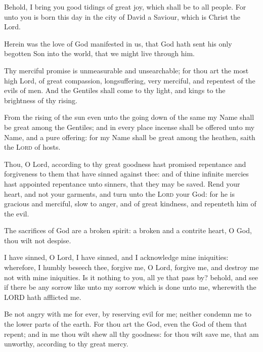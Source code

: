 \begin{multicols}{2}
	Behold, I bring you good tidings of great joy, which shall be to all people. For unto you is born this day in the city of David a Saviour, which is Christ the Lord.
	\par
	Herein was the love of God manifested in us, that God hath sent his only begotten Son into the world, that we might live through him. 
	\par
	Thy merciful promise is unmeasurable and unsearchable; for thou art the most high Lord, of great compassion, longsuffering, very merciful, and repentest of the evils of men. 
	And the Gentiles shall come to thy light, and kings to the brightness of thy rising.\par
	From the rising of the sun even unto the going down of the same my Name shall be great among the Gentiles; and in every place incense shall be offered unto my Name, and a pure offering: for my Name shall be great among the heathen, saith the \textsc{Lord} of hosts.
	\par
    Thou, O Lord, according to thy great goodness hast promised repentance and forgiveness to them that have sinned against thee: and of thine infinite mercies hast appointed repentance unto sinners, that they may be saved. 
	Rend your heart, and not your garments, and turn unto the \textsc{Lord} your God: for he is gracious and merciful, slow to anger, and of great kindness, and repenteth him of the evil.\par
    The sacrifices of God are a broken spirit: a broken and a contrite heart, O God, thou wilt not despise.\par
    I have sinned, O Lord, I have sinned, and I acknowledge mine iniquities: wherefore, I humbly beseech thee, forgive me, O Lord, forgive me, and destroy me not with mine iniquities. 
    Is it nothing to you, all ye that pass by? behold, and see if there be any sorrow like unto my sorrow which is done unto me, wherewith the LORD hath afflicted me.\par
    Be not angry with me for ever, by reserving evil for me; neither condemn me to the lower parts of the earth. For thou art the God, even the God of them that repent; and in me thou wilt shew all thy goodness: for thou wilt save me, that am unworthy, according to thy great mercy. 

\end{multicols}
